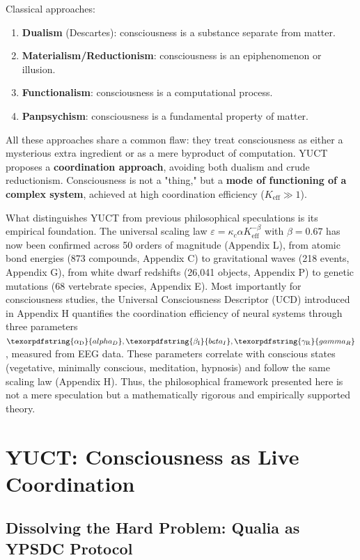 \documentclass[12pt,a4paper]{article}
\DeclareRobustCommand{\alD}{\texorpdfstring{\ensuremath{\alpha_{\mathrm{D}}}}{alpha_D}}
\DeclareRobustCommand{\beI}{\texorpdfstring{\ensuremath{\beta_{\mathrm{I}}}}{beta_I}}
\DeclareRobustCommand{\gaR}{\texorpdfstring{\ensuremath{\gamma_{\mathrm{R}}}}{gamma_R}}
\newcommand{\eff}{\mathrm{eff}}
\newcommand{\Ke}{K_{\eff}}
\begin{document}
	Classical approaches:
	\begin{enumerate}
		\item \textbf{Dualism} (Descartes): consciousness is a substance separate from matter.
		\item \textbf{Materialism/Reductionism}: consciousness is an epiphenomenon or illusion.
		\item \textbf{Functionalism}: consciousness is a computational process.
		\item \textbf{Panpsychism}: consciousness is a fundamental property of matter.
	\end{enumerate}
	
	All these approaches share a common flaw: they treat consciousness as either a mysterious extra ingredient or as a mere byproduct of computation. YUCT proposes a \textbf{coordination approach}, avoiding both dualism and crude reductionism. Consciousness is not a "thing," but a \textbf{mode of functioning of a complex system}, achieved at high coordination efficiency ($\Ke \gg 1$). 
	
	What distinguishes YUCT from previous philosophical speculations is its empirical foundation. The universal scaling law \(\varepsilon = \kappa_c \alpha \Ke^{-\beta}\) with \(\beta = 0.67\) has now been confirmed across 50 orders of magnitude (Appendix L), from atomic bond energies (873 compounds, Appendix C) to gravitational waves (218 events, Appendix G), from white dwarf redshifts (26,041 objects, Appendix P) to genetic mutations (68 vertebrate species, Appendix E). Most importantly for consciousness studies, the Universal Consciousness Descriptor (UCD) introduced in Appendix H quantifies the coordination efficiency of neural systems through three parameters \(\alD, \beI, \gaR\), measured from EEG data. These parameters correlate with conscious states (vegetative, minimally conscious, meditation, hypnosis) and follow the same scaling law (Appendix H). Thus, the philosophical framework presented here is not a mere speculation but a mathematically rigorous and empirically supported theory.
	
	\section{YUCT: Consciousness as Live Coordination}
	
	\subsection{Dissolving the Hard Problem: Qualia as YPSDC Protocol}
	
\end{document}
